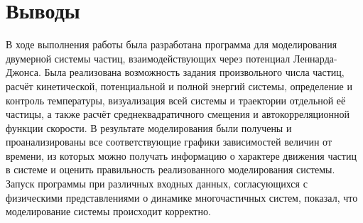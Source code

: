 \documentclass[14pt,a4paper,report]{ncc}
\begin{document}
\newpage\section{Выводы}
В ходе выполнения работы была разработана программа для моделирования двумерной системы частиц, взаимодействующих через потенциал Леннарда-Джонса. Была реализована возможность задания произвольного числа частиц, расчёт кинетической, потенциальной и полной энергий системы, определение и контроль температуры, визуализация всей системы и траектории отдельной её частицы, а также расчёт среднеквадратичного смещения и автокорреляционной функции скорости. В результате моделирования были получены и проанализированы все соответствующие графики зависимостей величин от времени, из которых можно получать информацию о характере движения частиц в системе и оценить правильность реализованного моделирования системы. Запуск программы при различных входных данных, согласующихся с физическими представлениями о динамике многочастичных систем, показал, что моделирование системы происходит корректно.
\end{document}
